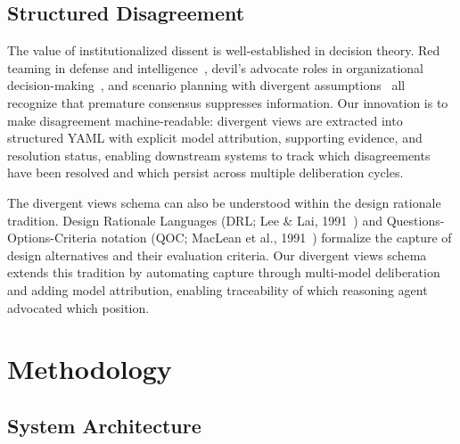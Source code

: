 \documentclass[11pt,a4paper]{article}
\begin{document}
\subsection{Structured Disagreement}

The value of institutionalized dissent is well-established in decision theory. Red teaming in defense and intelligence~\cite{zenko2015red}, devil's advocate roles in organizational decision-making~\cite{schwenk1990effects}, and scenario planning with divergent assumptions~\cite{schwartz1996art} all recognize that premature consensus suppresses information. Our innovation is to make disagreement machine-readable: divergent views are extracted into structured YAML with explicit model attribution, supporting evidence, and resolution status, enabling downstream systems to track which disagreements have been resolved and which persist across multiple deliberation cycles.

The divergent views schema can also be understood within the design rationale tradition. Design Rationale Languages (DRL; Lee \& Lai, 1991~\cite{lee1991drl}) and Questions-Options-Criteria notation (QOC; MacLean et al., 1991~\cite{maclean1991qoc}) formalize the capture of design alternatives and their evaluation criteria. Our divergent views schema extends this tradition by automating capture through multi-model deliberation and adding model attribution, enabling traceability of which reasoning agent advocated which position.

\section{Methodology}
\label{sec:methodology}

\subsection{System Architecture}
\label{sec:architecture}
\end{document}
